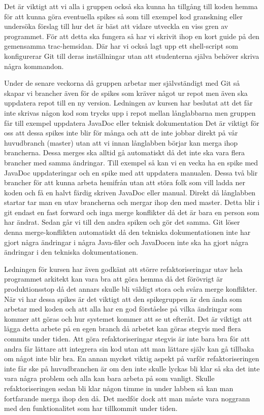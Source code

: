 Det är viktigt att vi alla i gruppen också ska kunna ha tillgång till koden hemma för att kunna göra eventuella spikes så som till exempel kod granskning eller undersöka förslag till hur det är bäst att vidare utveckla en viss gren av programmet. För att detta ska fungera så har vi skrivit ihop en kort guide på den gemensamma trac-hemsidan. Där har vi också lagt upp ett shell-script som konfigurerar Git till deras inställningar utan att studenterna själva behöver skriva några kommandon.

Under de senare veckorna då gruppen arbetar mer självständigt med Git så skapar vi brancher även för de spikes som kräver något ur repot men även ska uppdatera repot till en ny version. Ledningen av kursen har beslutat att det får inte skrivas någon kod som trycks upp i repot mellan långlabbarna men gruppen får till exempel uppdatera JavaDoc eller teknisk dokumentation Det är viktigt för oss att dessa spikes inte blir för många och att de inte jobbar direkt på vår huvudbranch (master) utan att vi innan långlabben börjar kan merga ihop brancherna. Dessa merges ska alltid gå automatiskt då det inte ska vara flera brancher med samma ändringar. Till exempel så kan vi en vecka ha en spike med JavaDoc uppdateringar och en spike med att uppdatera manualen. Dessa två blir brancher för att kunna arbeta hemifrån utan att störa folk som vill ladda ner koden och få en halvt färdig skriven JavaDoc eller manual. Direkt då långlabben startar tar man en utav brancherna och mergar ihop den med master. Detta blir i git endast en fast forward och inga merge konflikter då det är bara en person som har ändrat. Sedan går vi till den andra spiken och gör det samma. Git löser denna merge-konflikten automatiskt då den tekniska dokumentationen inte har gjort några ändringar i några Java-filer och JavaDocen inte ska ha gjort några ändringar i den tekniska dokumentationen.

Ledningen för kursen har även godkänt att större refaktoriseringar utav hela programmet arkitekt kan vara bra att göra hemma då det förövrigt är produktionsstop då det annars skulle bli väldigt stora och svåra merge konflikter. När vi har dessa spikes är det viktigt att den spikegruppen är den ända som arbetar med koden och att alla har en god förståelse på vilka ändringar som kommer att göras och hur systemet kommer att se ut efteråt. Det är viktigt att lägga detta arbete på en egen branch då arbetet kan göras stegvis med flera commits under tiden. Att göra refaktoriseringar stegvis är inte bara bra för att andra får lättare att integrera sin kod utan att man lättare själv kan gå tillbaka om något inte blir bra. En annan mycket viktig aspekt på varför refaktoriseringen inte får ske på huvudbranchen är om den inte skulle lyckas bli klar så ska det inte vara några problem och alla kan bara arbeta på som vanligt. Skulle refaktoriseringen sedan bli klar någon timme in under labben så kan man fortfarande merga ihop den då. Det medför dock att man måste vara noggrann med den funktionalitet som har tillkommit under tiden.


